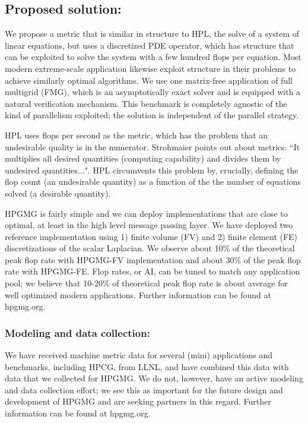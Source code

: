 \documentclass[11pt]{amsart}
\begin{document}
\subsection*{Proposed solution:} 
We propose a metric that is similar in structure to HPL, the solve of a system of linear equations, but uses a discretized PDE operator, which has structure that can be exploited to solve the system with a few hundred flops per equation.
Most modern extreme-scale application likewise exploit structure in their problems to achieve similarly optimal algorithms.
We use one matrix-free application of full multigrid (FMG), which is an asymptotically exact solver and is equipped with a natural verification mechanism. 
This benchmark is completely agnostic of the kind of parallelism exploited; the solution is independent of the parallel strategy.

HPL uses flops per second as the metric, which has the problem that an undesirable quality is in the numerator.
Strohmaier points out about metrics:  ``It multiplies all desired quantities (computing capability) and divides them by undesired quantities...". 
HPL circumvents this problem by, crucially, defining the flop count (an undesirable quantity) as a function of the the number of equations solved (a desirable quantity). 

HPGMG is fairly simple and we can deploy implementations that are close to optimal, at least in the high level message passing layer.
We have deployed two reference implementation using 1) finite volume (FV) and 2) finite element (FE) discretizations of the scalar Laplacian.
We observe about 10\% of the theoretical peak flop rate with HPGMG-FV implementation and about 30\% of the peak flop rate with HPGMG-FE.
Flop rates, or AI, can be tuned to match any application pool; we believe that 10-20\% of theoretical peak flop rate is about average for well optimized modern applications.
Further information can be found at hpgmg.org.


\subsubsection*{Modeling and data collection:}
We have received machine metric data for several (mini) applications and benchmarks, including HPCG, from LLNL, and have combined this data with data that we collected for HPGMG.
We do not, however, have an active modeling and data collection effort; we see this as important for the future design and development of HPGMG and are seeking partners in this regard.
Further information can be found at hpgmg.org.
\end{document}
